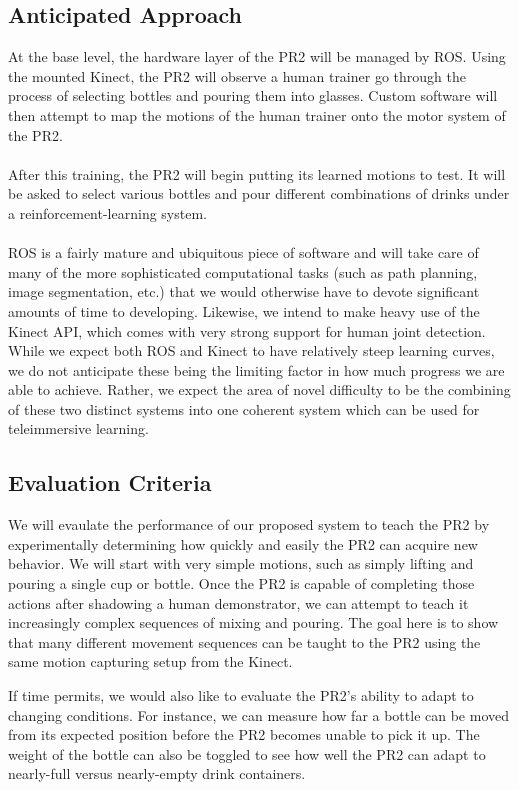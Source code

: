 \documentclass{sig-alternate}
\begin{document}
\subsection{Anticipated Approach}
\label{subsec:approach}
At the base level, the hardware layer of the PR2 will be managed by ROS.
Using the mounted Kinect, the PR2 will observe a human trainer go
through the process of selecting bottles and pouring them into glasses. Custom 
software will then attempt to map the motions of the human trainer onto the 
motor system of the PR2.
\\
\\After this training, the PR2 will begin putting its learned motions to test.
It will be asked to select various bottles and  pour different combinations of
drinks under a reinforcement-learning system.
\\
\\ROS is a fairly mature and ubiquitous piece of software and will take care of
many of the more sophisticated computational tasks (such as path planning, 
image segmentation, etc.) that we would otherwise have to devote significant 
amounts of time to developing.  
Likewise, we intend to make heavy use of the Kinect API, which comes with very
strong support for human joint detection.
While we expect both ROS and Kinect to have relatively steep learning curves,
we do not anticipate these being the limiting factor in how much progress we
are able to achieve. 
Rather, we expect the area of novel difficulty to be the combining of these
two distinct systems into one coherent system which can be used for
teleimmersive learning.

\subsection{Evaluation Criteria}
\label{subsec:eval_criteria}
We will evaulate the performance of our proposed system to teach the PR2 by experimentally determining how quickly and easily the PR2
can acquire new behavior. We will start with very simple motions, such as simply lifting and pouring a single cup or bottle. Once the PR2 is capable of completing those actions after shadowing a human demonstrator, we can attempt to teach it increasingly complex sequences of mixing and pouring. The goal here is to show that many different movement sequences can be taught to the PR2 using the same motion capturing setup from the Kinect.

If time permits, we would also like to evaluate the PR2's ability to adapt to changing conditions. For instance, we can measure how far a bottle can be moved from its expected position before the PR2 becomes unable to pick it up. The weight of the bottle can also be toggled to see how well the PR2 can adapt to nearly-full versus nearly-empty drink containers.
\end{document}
